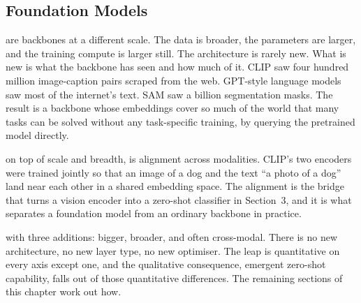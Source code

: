 
\subsection{Foundation Models}


 are backbones at a different scale. The data is broader, the parameters are larger, and the training compute is larger still. The architecture is rarely new. What is new is what the backbone has seen and how much of it. CLIP\cite{Radford2021CLIP} saw four hundred million image-caption pairs scraped from the web. GPT-style language models\cite{Brown2020GPT3} saw most of the internet's text. SAM\cite{Kirillov2023SAM} saw a billion segmentation masks. The result is a backbone whose embeddings cover so much of the world that many tasks can be solved without any task-specific training, by querying the pretrained model directly.

 on top of scale and breadth, is alignment across modalities. CLIP's two encoders were trained jointly so that an image of a dog and the text ``a photo of a dog'' land near each other in a shared embedding space. The alignment is the bridge that turns a vision encoder into a zero-shot classifier in Section~3, and it is what separates a foundation model from an ordinary backbone in practice.

 with three additions: bigger, broader, and often cross-modal. There is no new architecture, no new layer type, no new optimiser. The leap is quantitative on every axis except one, and the qualitative consequence, emergent zero-shot capability, falls out of those quantitative differences. The remaining sections of this chapter work out how.

\vspace{2.5em}


